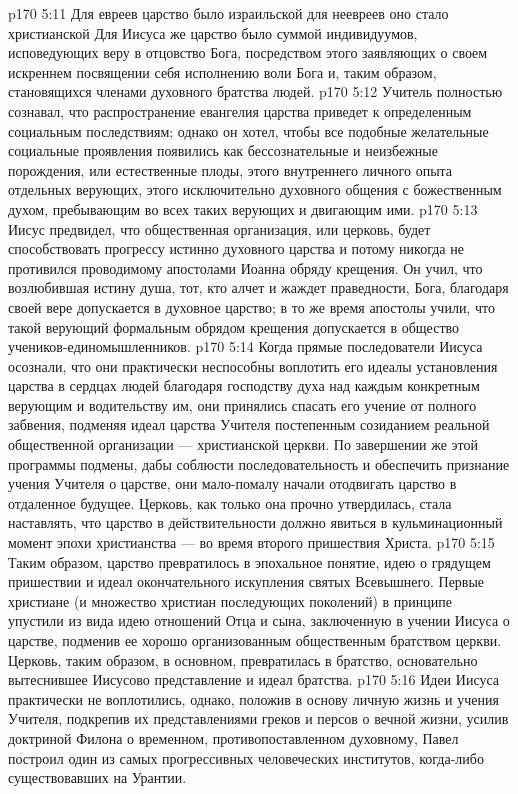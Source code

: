 \vs p170 5:11 Для евреев царство было израильской  для неевреев оно стало христианской  Для Иисуса же царство было суммой индивидуумов, исповедующих веру в отцовство Бога, посредством этого заявляющих о своем искреннем посвящении себя исполнению воли Бога и, таким образом, становящихся членами духовного братства людей.
\vs p170 5:12 Учитель полностью сознавал, что распространение евангелия царства приведет к определенным социальным последствиям; однако он хотел, чтобы все подобные желательные социальные проявления появились как бессознательные и неизбежные порождения, или естественные плоды, этого внутреннего личного опыта отдельных верующих, этого исключительно духовного общения с божественным духом, пребывающим во всех таких верующих и двигающим ими.
\vs p170 5:13 Иисус предвидел, что общественная организация, или церковь, будет способствовать прогрессу истинно духовного царства и потому никогда не противился проводимому апостолами Иоанна обряду крещения. Он учил, что возлюбившая истину душа, тот, кто алчет и жаждет праведности, Бога, благодаря своей вере допускается в духовное царство; в то же время апостолы учили, что такой верующий формальным обрядом крещения допускается в общество учеников\hyp{}единомышленников.
\vs p170 5:14 Когда прямые последователи Иисуса осознали, что они практически неспособны воплотить его идеалы установления царства в сердцах людей благодаря господству духа над каждым конкретным верующим и водительству им, они принялись спасать его учение от полного забвения, подменяя идеал царства Учителя постепенным созиданием реальной общественной организации --- христианской церкви. По завершении же этой программы подмены, дабы соблюсти последовательность и обеспечить признание учения Учителя о царстве, они мало\hyp{}помалу начали отодвигать царство в отдаленное будущее. Церковь, как только она прочно утвердилась, стала наставлять, что царство в действительности должно явиться в кульминационный момент эпохи христианства --- во время второго пришествия Христа.
\vs p170 5:15 Таким образом, царство превратилось в эпохальное понятие, идею о грядущем пришествии и идеал окончательного искупления святых Всевышнего. Первые христиане (и множество христиан последующих поколений) в принципе упустили из вида идею отношений Отца и сына, заключенную в учении Иисуса о царстве, подменив ее хорошо организованным общественным братством церкви. Церковь, таким образом, в основном, превратилась в  братство, основательно вытеснившее Иисусово представление и идеал  братства.
\vs p170 5:16 Идеи Иисуса практически не воплотились, однако, положив в основу личную жизнь и учения Учителя, подкрепив их представлениями греков и персов о вечной жизни, усилив доктриной Филона о временном, противопоставленном духовному, Павел построил один из самых прогрессивных человеческих институтов, когда\hyp{}либо существовавших на Урантии.
